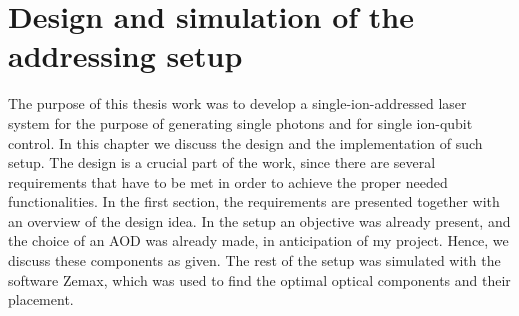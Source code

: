 \chapter{Design and simulation of the addressing setup}
The purpose of this thesis work was to develop a single-ion-addressed laser system for the purpose of generating single photons and for single ion-qubit control. In this chapter we discuss the design and the implementation of such setup. The design is a crucial part of the work, since there are several requirements that have to be met in order to achieve the proper needed functionalities. In the first section, the requirements are presented together with an overview of the design idea. In the setup an objective was already present, and the choice of an AOD was already made, in anticipation of my project. Hence, we discuss these components as given. The rest of the setup was simulated with the software Zemax, which was used to find the optimal optical components and their placement.
